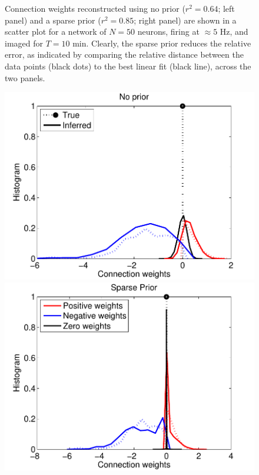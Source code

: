 \begin{figure}[h]
\begin{minipage}[c]{0.45\hsize}
\end{minipage}
\caption{Connection weights reconstructed using no prior ($r^2=0.64$; left panel) and a sparse prior ($r^2=0.85$; right panel) are shown in a scatter plot for a network of $N=50$ neurons, firing at $\approx 5$ Hz, and imaged for $T=10$ min. Clearly, the sparse prior reduces the relative error, as indicated by comparing the relative distance between the data points (black dots) to the best linear fit (black line), across the two panels.  }
\label{fig:sparse}
\end{figure}

\begin{figure}[h]
\centering
\begin{minipage}[c]{0.45\hsize}
\includegraphics[width=\hsize]{../figs/FigureA3_hist_glm200}
\end{minipage}
\begin{minipage}[c]{0.45\hsize}
\includegraphics[width=\hsize]{../figs/FigureA3_hist_spa200}

\end{minipage}
\end{figure}
